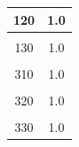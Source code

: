 \documentclass[paper=a4, fontsize=11pt]{article}
\begin{document}
\begin{table}[!htb]
\begin{minipage}{.3\linewidth}
\begin{tabular}{|c|c|}
		120              & 1.0                  \\ \hline &\\[-1em]
		130              & 1.0                  \\ \hline &\\[-1em]
		310              & 1.0                  \\ \hline &\\[-1em]
		320              & 1.0                  \\ \hline &\\[-1em]
		330              & 1.0                  \\ \hline
		\end{tabular}
	\end{minipage}%
\end{table}
\end{document}
